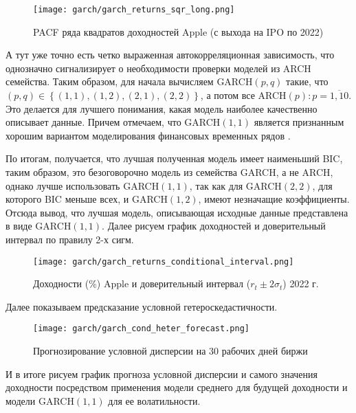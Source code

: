 \begin{figure}[H]
	\centering
	\texttt{[image: garch/garch\_returns\_sqr\_long.png]}
	\caption{PACF ряда квадратов доходностей Apple (с выхода на IPO по 2022)}
\end{figure}
\noindent А тут уже точно есть четко выраженная автокорреляционная зависимость, что однозначно сигнализирует о необходимости проверки моделей из ARCH семейства. Таким образом, для начала вычисляем GARCH$(p, q)$ такие, что $(p, q) \in \left\{(1, 1), (1, 2), (2, 1), (2, 2)\right\}$, а потом все ARCH$(p): p = \overline{1,10}$. Это делается для лучшего понимания, какая модель наиболее качественно описывает данные. Причем отмечаем, что GARCH$(1, 1)$ является признанным хорошим вариантом моделирования финансовых временных рядов \cite{hansen2005forecast}.



\begin{landscape}
	
\end{landscape}

По итогам, получается, что лучшая полученная модель имеет наименьший BIC, таким образом, это безоговорочно модель из семейства GARCH, а не ARCH, однако лучше использовать GARCH$(1, 1)$, так как для GARCH$(2, 2)$, для которого BIC меньше всех, и GARCH$(1, 2)$, имеют незначащие коэффициенты. Отсюда вывод, что лучшая модель, описывающая исходные данные представлена в виде GARCH$(1, 1)$. Далее рисуем график доходностей и доверительный интервал по правилу 2-х сигм. 

\begin{figure}[H]
	\centering
	\texttt{[image: garch/garch\_returns\_conditional\_interval.png]}
	\caption{Доходности (\%) Apple и доверительный интервал ($r_t \pm 2\hat{\sigma}_t$) 2022 г.}
\end{figure}

\noindent Далее показываем предсказание условной гетероскедастичности.

\begin{figure}[H]
	\centering
	\texttt{[image: garch/garch\_cond\_heter\_forecast.png]}
	\caption{Прогнозирование условной дисперсии на 30 рабочих дней биржи}
\end{figure}

\noindent И в итоге рисуем график прогноза условной дисперсии и самого значения доходности посредством применения модели среднего для будущей доходности и модели GARCH$(1, 1)$ для ее волатильности.

